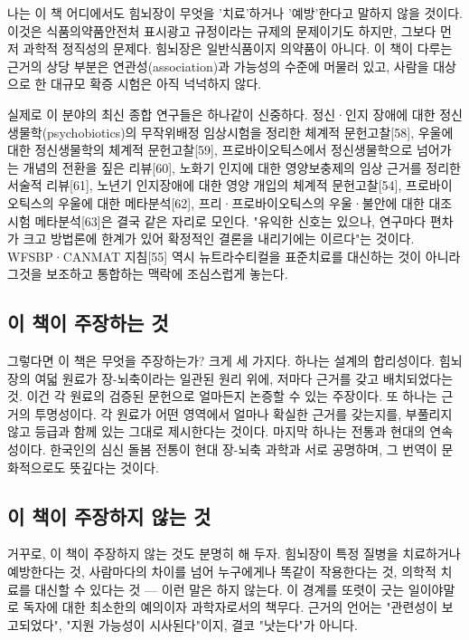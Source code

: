 \documentclass[12pt,oneside]{book}
\begin{document}
나는 이 책 어디에서도 힘뇌장이 무엇을 '치료'하거나 '예방'한다고 말하지 않을 것이다. 이것은 식품의약품안전처 표시광고 규정이라는 규제의 문제이기도 하지만, 그보다 먼저 과학적 정직성의 문제다. 힘뇌장은 일반식품이지 의약품이 아니다. 이 책이 다루는 근거의 상당 부분은 연관성(association)과 가능성의 수준에 머물러 있고, 사람을 대상으로 한 대규모 확증 시험은 아직 넉넉하지 않다.

실제로 이 분야의 최신 종합 연구들은 하나같이 신중하다. 정신·인지 장애에 대한 정신생물학(psychobiotics)의 무작위배정 임상시험을 정리한 체계적 문헌고찰[58], 우울에 대한 정신생물학의 체계적 문헌고찰[59], 프로바이오틱스에서 정신생물학으로 넘어가는 개념의 전환을 짚은 리뷰[60], 노화기 인지에 대한 영양보충제의 임상 근거를 정리한 서술적 리뷰[61], 노년기 인지장애에 대한 영양 개입의 체계적 문헌고찰[54], 프로바이오틱스의 우울에 대한 메타분석[62], 프리·프로바이오틱스의 우울·불안에 대한 대조시험 메타분석[63]은 결국 같은 자리로 모인다. "유익한 신호는 있으나, 연구마다 편차가 크고 방법론에 한계가 있어 확정적인 결론을 내리기에는 이르다"는 것이다. WFSBP·CANMAT 지침[55] 역시 뉴트라수티컬을 표준치료를 대신하는 것이 아니라 그것을 보조하고 통합하는 맥락에 조심스럽게 놓는다.

\subsection{이 책이 주장하는 것}

그렇다면 이 책은 무엇을 주장하는가? 크게 세 가지다. 하나는 설계의 합리성이다. 힘뇌장의 여덟 원료가 장-뇌축이라는 일관된 원리 위에, 저마다 근거를 갖고 배치되었다는 것. 이건 각 원료의 검증된 문헌으로 얼마든지 논증할 수 있는 주장이다. 또 하나는 근거의 투명성이다. 각 원료가 어떤 영역에서 얼마나 확실한 근거를 갖는지를, 부풀리지 않고 등급과 함께 있는 그대로 제시한다는 것이다. 마지막 하나는 전통과 현대의 연속성이다. 한국인의 심신 돌봄 전통이 현대 장-뇌축 과학과 서로 공명하며, 그 번역이 문화적으로도 뜻깊다는 것이다.

\subsection{이 책이 주장하지 않는 것}

거꾸로, 이 책이 주장하지 않는 것도 분명히 해 두자. 힘뇌장이 특정 질병을 치료하거나 예방한다는 것, 사람마다의 차이를 넘어 누구에게나 똑같이 작용한다는 것, 의학적 치료를 대신할 수 있다는 것 — 이런 말은 하지 않는다. 이 경계를 또렷이 긋는 일이야말로 독자에 대한 최소한의 예의이자 과학자로서의 책무다. 근거의 언어는 "관련성이 보고되었다", "지원 가능성이 시사된다"이지, 결코 "낫는다"가 아니다.
\end{document}
